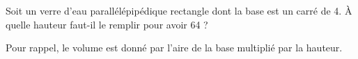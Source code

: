 
\begin{exercice}\label{exoSeconde-0064}

    Soit un verre d'eau parallélépipédique rectangle dont la base est un carré de \unit{4}{\centi\meter}. À quelle hauteur faut-il le remplir pour avoir \unit{64}{\centi\meter\cubed} ?

    Pour rappel, le volume est donné par l'aire de la base multiplié par la hauteur.

\end{exercice}
